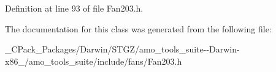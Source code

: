 Definition at line 93 of file Fan203.\+h.



The documentation for this class was generated from the following file\+:\begin{DoxyCompactItemize}
\item 
\+\_\+\+C\+Pack\+\_\+\+Packages/\+Darwin/\+S\+T\+G\+Z/amo\+\_\+tools\+\_\+suite-\/-\/\+Darwin-\/x86\+\_/amo\+\_\+tools\+\_\+suite/include/fans/Fan203.\+h\end{DoxyCompactItemize}
